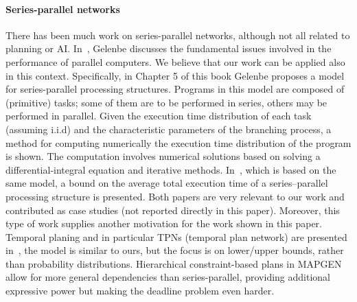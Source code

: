 \documentclass[review]{elsarticle}
\begin{document}
\paragraph{Series-parallel networks} There has been much work on series-parallel networks, although not all related to planning or AI. In~\cite{gelenbe1989multiprocessor}, Gelenbe discusses the fundamental issues involved in the performance of parallel computers. We believe that our work can be applied also in this context. Specifically, in Chapter 5 of this book Gelenbe proposes a model for series-parallel processing structures. Programs in this model are composed of (primitive) tasks; some of them are to be performed in series, others may be performed in parallel. Given the execution time distribution of each task (assuming i.i.d) and the characteristic parameters of the branching process, a method for computing numerically the execution time distribution of the program is shown. The computation involves numerical solutions based on solving a differential-integral equation and iterative methods. In~\cite{gutjahr1992average}, which is based on the same model, a bound on the average total execution time of a series–parallel processing structure is presented. Both papers are very relevant to our work and contributed as case studies (not reported directly in this paper). Moreover, this type of work supplies another motivation for the work shown in this paper. Temporal planing and in particular TPNs (temporal plan network) are presented in~\cite{kim2001executing}, the model is similar to ours, but the focus is on lower/upper bounds, rather than probability distributions. Hierarchical constraint-based plans in MAPGEN~\cite{MAPGEN} allow for more
general dependencies than series-parallel, providing additional expressive power but making the deadline problem even harder.
\end{document}
